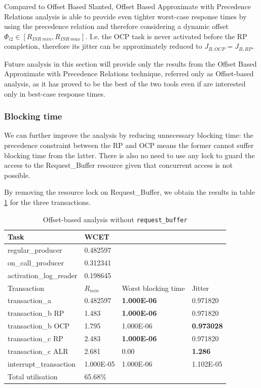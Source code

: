 \documentclass{article}
\begin{document}
Compared to Offset Based Slanted, Offset Based Approximate with Precedence Relations analysis is able to provide even tighter worst-case response times by using the precedence relation and therefore considering a dynamic offset $\Phi_{i2} \in [R_{ISR\ min}, R_{ISR\ max}]$. I.e. the OCP task is never activated before the RP completion, therefore its jitter can be approximately reduced to $J_{B, OCP} = J_{B, RP}$.

Future analysis in this section will provide only the results from the Offset Based Approximate with Precedence Relations technique, referred only as Offset-based analysis, as it has proved to be the best of the two tools even if are interested only in best-case response times.

\subsubsection{Blocking time}

We can further improve the analysis by reducing unnecessary blocking time: the precedence constraint between the RP and OCP means the former cannot suffer blocking time from the latter. There is also no need to use any lock to guard the access to the Request\_Buffer resource given that concurrent access is not possible.

By removing the resource lock on Request\_Buffer, we obtain the results in table \ref{tab:off-approx-w-pr-blocking-time} for the three transactions.

\begin{table}[!htbp]
   \centering
   \begin{tabular}{llll}
    \toprule
    Task & WCET \\
    \midrule
    regular\_producer & 0.482597 \\
    on\_call\_producer & 0.312341 \\
    activation\_log\_reader & 0.198645 \\
    \toprule
    \toprule
    Transaction & $R_{min}$ & Worst blocking time & Jitter \\
    \midrule
    transaction\_a & 0.482597 &  \textbf{1.000E-06} & 0.971820 \\
    transaction\_b RP & 1.483 & \textbf{1.000E-06} & 0.971820 \\
    transaction\_b OCP & 1.795 & 1.000E-06 & \textbf{0.973028} \\
    transaction\_c RP & 2.483 & \textbf{1.000E-06} & 0.971820 \\
    transaction\_c ALR & 2.681 & 0.00 & \textbf{1.286} \\
    interrupt\_transaction & 1.000E-05 & 1.000E-06 & 1.102E-05 \\
    \toprule
    \toprule
    Total utilisation & 65.68\% \\
   \end{tabular}
   \caption{Offset-based analysis without \texttt{request\_buffer}}
   \label{tab:off-approx-w-pr-blocking-time}
 \end{table}
\end{document}
